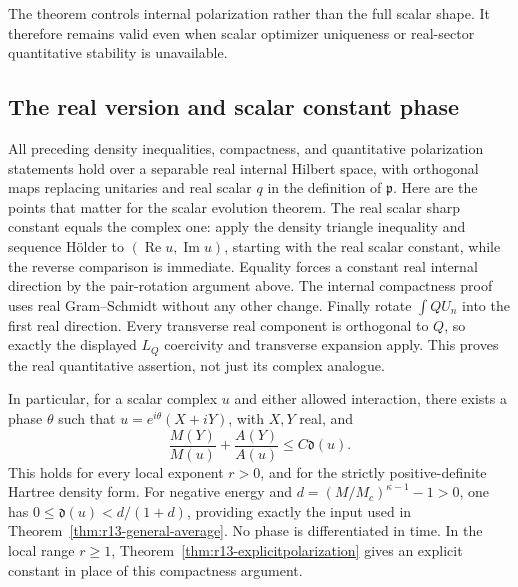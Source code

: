 The theorem controls internal polarization rather than the full
scalar shape. It therefore remains valid even when scalar optimizer
uniqueness or real-sector quantitative stability is unavailable.

\subsection{The real version and scalar constant phase}
\label{subsec:r13-real-phase}
All preceding density inequalities, compactness, and quantitative
polarization statements hold over a separable real internal Hilbert
space, with orthogonal maps replacing unitaries and real scalar $q$
in the definition of $\mathfrak p$. Here are the points that matter
for the scalar evolution theorem. The real scalar sharp constant
equals the complex one: apply the density triangle inequality and
sequence H\"older to $(\operatorname{Re}u,\operatorname{Im}u)$,
starting with the real scalar constant, while the reverse comparison
is immediate. Equality forces a constant real internal direction
by the pair-rotation argument above. The internal compactness proof
uses real Gram--Schmidt without any other change. Finally rotate
$\int QU_n$ into the first real direction. Every transverse real
component is orthogonal to $Q$, so exactly the displayed $L_Q$
coercivity and transverse expansion apply. This proves the real
quantitative assertion, not just its complex analogue.

In particular, for a scalar complex $u$ and either allowed interaction,
there exists a phase $\theta$ such that $u=e^{i\theta}(X+iY)$,
with $X,Y$ real, and
\[
 \frac{M(Y)}{M(u)}+\frac{A(Y)}{A(u)}\le C\mathfrak d(u).
\]
This holds for every local exponent $r>0$, and for the strictly
positive-definite Hartree density form. For negative energy and
$d=(M/M_c)^{\kappa-1}-1>0$, one has
$0\le\mathfrak d(u)<d/(1+d)$, providing exactly the input used
in Theorem~\ref{thm:r13-general-average}. No phase is differentiated
in time. In the local range $r\ge1$,
Theorem~\ref{thm:r13-explicitpolarization} gives an explicit constant
in place of this compactness argument.
